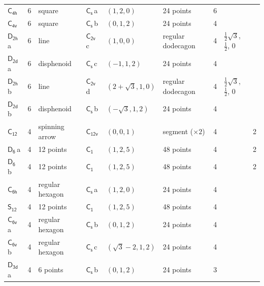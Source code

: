 \documentclass[10pt,a4paper]{article}
\numberwithin{equation}{section}
\newcommand{\grp}[1]{\mathsf{#1}}
\newcommand{\clsletter}[1]{\,{\scriptsize\color{black!55}#1}}
\newlength{\fillwidth}\newlength{\cellwidth}\newlength{\colwidth}
\begin{document}
{{\begin{longtable}{@{}lrllllr>{\RaggedRight\arraybackslash}p{\fillwidth}r@{}}
\href{C4h.pdf}{$\grp{C_{4h}}$} & 6 & square & \href{C1v.pdf}{$\grp{C_{s}}$}\clsletter{a} & $(1, 2, 0)$ & 24 points & 6 &  & \\
\href{C4v.pdf}{$\grp{C_{4v}}$} & 6 & square & \href{C1v.pdf}{$\grp{C_{s}}$}\clsletter{b} & $(0, 1, 2)$ & 24 points & 4 &  & \\
\href{D2h.pdf}{$\grp{D_{2h}}$}\clsletter{a} & 6 & line & \href{C2v.pdf}{$\grp{C_{2v}}$}\clsletter{c} & $(1, 0, 0)$ & regular dodecagon & 4 & ${\tfrac{1}{2}\sqrt{3}}$, ${\tfrac{1}{2}}$, ${0}$ & \\
\href{D2d.pdf}{$\grp{D_{2d}}$}\clsletter{a} & 6 & disphenoid & \href{C1v.pdf}{$\grp{C_{s}}$}\clsletter{c} & $(-1, 1, 2)$ & 24 points & 4 &  & \\
\href{D2h.pdf}{$\grp{D_{2h}}$}\clsletter{b} & 6 & line & \href{C2v.pdf}{$\grp{C_{2v}}$}\clsletter{d} & $(2 + \sqrt{3}, 1, 0)$ & regular dodecagon & 4 & ${\tfrac{1}{2}\sqrt{3}}$, ${\tfrac{1}{2}}$, ${0}$ & \\
\href{D2d.pdf}{$\grp{D_{2d}}$}\clsletter{b} & 6 & disphenoid & \href{C1v.pdf}{$\grp{C_{s}}$}\clsletter{b} & $(-\sqrt{3}, 1, 2)$ & 24 points & 4 &  & \\
\href{C12.pdf}{$\grp{C_{12}}$} & 4 & spinning arrow & \href{C12v.pdf}{$\grp{C_{12v}}$} & $(0, 0, 1)$ & segment (${\times}2$) & 4 &  & 2\\
\href{D6.pdf}{$\grp{D_{6}}$}\clsletter{a} & 4 & 12 points & \href{C1.pdf}{$\grp{C_{1}}$} & $(1, 2, 5)$ & 48 points & 4 &  & 2\\
\href{D6.pdf}{$\grp{D_{6}}$}\clsletter{b} & 4 & 12 points & \href{C1.pdf}{$\grp{C_{1}}$} & $(1, 2, 5)$ & 48 points & 4 &  & 2\\
\href{C6h.pdf}{$\grp{C_{6h}}$} & 4 & regular hexagon & \href{C1v.pdf}{$\grp{C_{s}}$}\clsletter{a} & $(1, 2, 0)$ & 24 points & 4 &  & \\
\href{S12.pdf}{$\grp{S_{12}}$} & 4 & 12 points & \href{C1.pdf}{$\grp{C_{1}}$} & $(1, 2, 5)$ & 48 points & 4 &  & \\
\href{C6v.pdf}{$\grp{C_{6v}}$}\clsletter{a} & 4 & regular hexagon & \href{C1v.pdf}{$\grp{C_{s}}$}\clsletter{b} & $(0, 1, 2)$ & 24 points & 4 &  & \\
\href{C6v.pdf}{$\grp{C_{6v}}$}\clsletter{b} & 4 & regular hexagon & \href{C1v.pdf}{$\grp{C_{s}}$}\clsletter{c} & $(\sqrt{3} - 2, 1, 2)$ & 24 points & 4 &  & \\
\href{D3d.pdf}{$\grp{D_{3d}}$}\clsletter{a} & 4 & 6 points & \href{C1v.pdf}{$\grp{C_{s}}$}\clsletter{b} & $(0, 1, 2)$ & 24 points & 3 &  & \\

\end{longtable}}}
\end{document}
